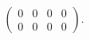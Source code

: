 \begin{Exercise}
\begin{solution}
$$
\begin{pmatrix}
0 & 0 & 0 & 0 \\
0 & 0 & 0 & 0
\end{pmatrix}.
$$
\end{solution}
\end{Exercise}